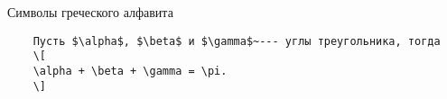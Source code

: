 \begin{frame}[fragile]{Символы греческого алфавита}
\large



\begin{verbatim}
	Пусть $\alpha$, $\beta$ и $\gamma$~--- углы треугольника, тогда
	\[
	\alpha + \beta + \gamma = \pi.
	\]
\end{verbatim}	




\end{frame}